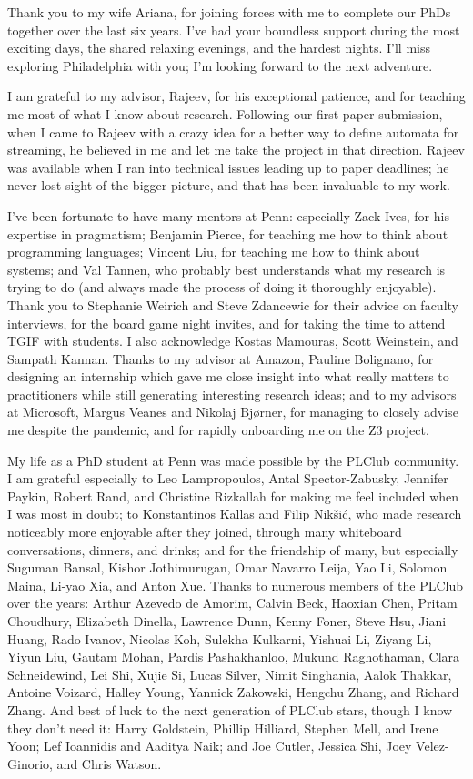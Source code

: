 Thank you to my wife Ariana, for joining forces with me to complete our PhDs together over the last six years.
I've had your boundless support during the most exciting days, the shared relaxing evenings, and the hardest nights.
I'll miss exploring Philadelphia with you; I'm looking forward to the next adventure.

I am grateful to my advisor, Rajeev, for his exceptional patience, and for teaching me most of what I know about research.
Following our first paper submission, when I came to Rajeev with a crazy idea for a better way to define automata for streaming, he believed in me and let me take the project in that direction.
Rajeev was available when I ran into technical issues leading up to paper deadlines; he never lost sight of the bigger picture,
and that has been invaluable to my work.

I've been fortunate to have many mentors at Penn: especially Zack Ives, for his expertise in pragmatism; Benjamin Pierce, for teaching me how to think about programming languages; Vincent Liu, for teaching me how to think about systems; and Val Tannen, who probably best understands what my research is trying to do (and always made the process of doing it thoroughly enjoyable).
Thank you to Stephanie Weirich and Steve Zdancewic for their advice on faculty interviews, for the board game night invites, and for taking the time to attend TGIF with students.
I also acknowledge Kostas Mamouras, Scott Weinstein, and Sampath Kannan.
Thanks to my advisor at Amazon, Pauline Bolignano, for designing an internship which gave me close insight into what really matters to practitioners while still generating interesting research ideas; and to my advisors at Microsoft, Margus Veanes and Nikolaj Bjørner,
for managing to closely advise me despite the pandemic, and for rapidly onboarding me on the Z3 project.

My life as a PhD student at Penn was made possible by the PLClub community.
I am grateful especially to Leo Lampropoulos, Antal Spector-Zabusky, Jennifer Paykin, Robert Rand, and Christine Rizkallah for making me feel included when I was most in doubt;
to Konstantinos Kallas and Filip Nikšić, who made research noticeably more enjoyable after they joined, through many whiteboard conversations, dinners, and drinks;
and for the friendship of many, but especially Suguman Bansal, Kishor Jothimurugan, Omar Navarro Leija, Yao Li, Solomon Maina, Li-yao Xia, and Anton Xue.
Thanks to numerous members of the PLClub over the years:
Arthur Azevedo de Amorim,
Calvin Beck,
Haoxian Chen,
Pritam Choudhury,
Elizabeth Dinella,
Lawrence Dunn,
Kenny Foner,
Steve Hsu,
Jiani Huang,
Rado Ivanov,
Nicolas Koh,
Sulekha Kulkarni,
Yishuai Li,
Ziyang Li,
Yiyun Liu,
Gautam Mohan,
Pardis Pashakhanloo,
Mukund Raghothaman,
Clara Schneidewind,
Lei Shi,
Xujie Si,
Lucas Silver,
Nimit Singhania,
Aalok Thakkar,
Antoine Voizard,
Halley Young,
Yannick Zakowski,
Hengchu Zhang,
and
Richard Zhang.
And best of luck to the next generation of PLClub stars,
though I know they don't need it:
Harry Goldstein,
Phillip Hilliard,
Stephen Mell,
and Irene Yoon;
Lef Ioannidis
and Aaditya Naik;
and Joe Cutler, Jessica Shi, Joey Velez-Ginorio, and Chris Watson.

